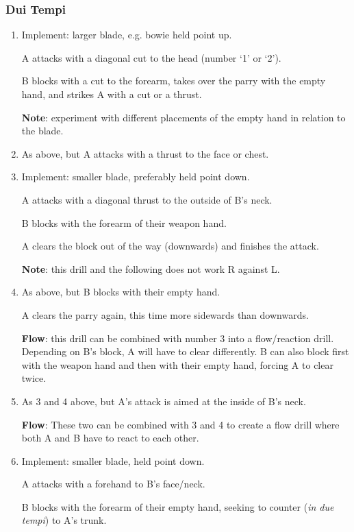 \documentclass[article, 12pt, a4paper]{memoir}
\begin{document}
\subsubsection*{Dui Tempi}
\begin{enumerate}
    \item Implement: larger blade, e.g. bowie held point up.

        A attacks with a diagonal cut to the head (number `1' or `2').

        B blocks with a cut to the forearm, takes over the parry with the empty hand, and strikes A with a cut or a thrust.

        \textbf{Note}: experiment with different placements of the empty hand in relation to the blade.
    \item As above, but A attacks with a thrust to the face or chest.
    \item Implement: smaller blade, preferably held point down.

        A attacks with a diagonal thrust to the outside of B's neck.

        B blocks with the forearm of their weapon hand.

        A clears the block out of the way (downwards) and finishes the attack.

        \textbf{Note}: this drill and the following does not work R against L.

    \item As above, but B blocks with their empty hand.

        A clears the parry again, this time more sidewards than downwards.

        \textbf{Flow}: this drill can be combined with number 3 into a flow/reaction drill.
        Depending on B's block, A will have to clear differently.
        B can also block first with the weapon hand and then with their empty hand, forcing A to clear twice.
    \item As 3 and 4 above, but A's attack is aimed at the inside of B's neck.

        \textbf{Flow}: These two can be combined with 3 and 4 to create a flow drill where both A and B have to react to each other.
    \item Implement: smaller blade, held point down.

        A attacks with a forehand to B's face/neck.

        B blocks with the forearm of their empty hand, seeking to counter (\emph{in due tempi}) to A's trunk.


\end{enumerate}
\end{document}
